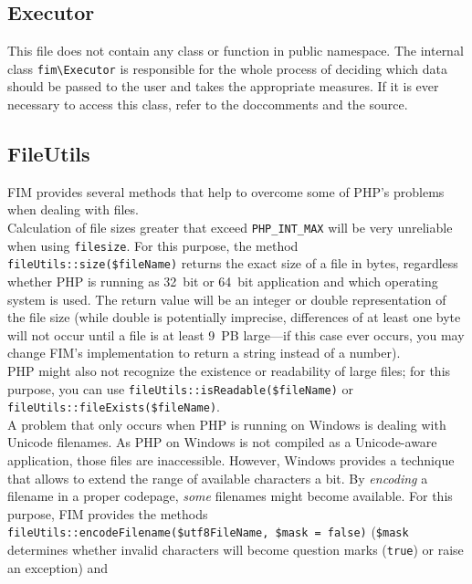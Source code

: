 \documentclass{scrartcl}
\begin{document}
   \subsection{Executor}
      This file does not contain any class or function in public namespace. The internal class \lstinline!fim\Executor! is responsible for the whole process of deciding which data should be passed to the user and takes the appropriate measures. If it is ever necessary to access this class, refer to the doccomments and the source.
   \subsection{FileUtils}
      FIM provides several methods that help to overcome some of PHP's problems when dealing with files. \\
      Calculation of file sizes greater that exceed \lstinline!PHP_INT_MAX! will be very unreliable when using \lstinline!filesize!. For this purpose, the method \lstinline!fileUtils::size($fileName)! returns the exact size of a file in bytes, regardless whether PHP is running as 32~bit or 64~bit application and which operating system is used. The return value will be an integer or double representation of the file size (while double is potentially imprecise, differences of at least one byte will not occur until a file is at least 9~PB large---if this case ever occurs, you may change FIM's implementation to return a string instead of a number). \\
      PHP might also not recognize the existence or readability of large files; for this purpose, you can use \lstinline!fileUtils::isReadable($fileName)! or \lstinline!fileUtils::fileExists($fileName)!. \\
      A problem that only occurs when PHP is running on Windows is dealing with Unicode filenames. As PHP on Windows is not compiled as a Unicode-aware application, those files are inaccessible. However, Windows provides a technique that allows to extend the range of available characters a bit. By \emph{encoding} a filename in a proper codepage, \emph{some} filenames might become available. For this purpose, FIM provides the methods \lstinline!fileUtils::encodeFilename($utf8FileName, $mask = false)! (\lstinline!$mask! determines whether invalid characters will become question marks (\lstinline!true!) or raise an exception) and \\
\end{document}
